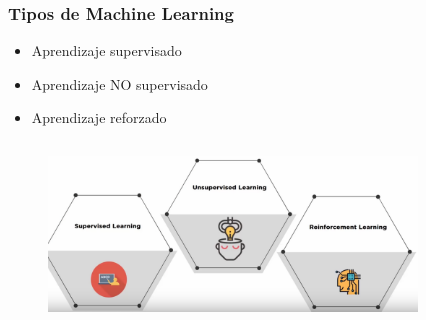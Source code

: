 \documentclass[10pt]{beamer}
\begin{document}
\begin{frame}
\frametitle{Tipos de Machine Learning}
\begin{beamerboxesrounded}[upper=uppercolor, lower=lowercolor, shadow=true]{} 

\begin{itemize}
 \item Aprendizaje supervisado
 \item Aprendizaje NO supervisado
 \item Aprendizaje reforzado
\end{itemize}
\end{beamerboxesrounded}

\begin{columns}

\hspace{5mm}
\hspace{5mm}
\begin{column}{\textwidth}
 \begin{figure}
 \includegraphics[scale=0.175]{./Figures/tipos.png} 
 \end{figure}
\end{column}%

\begin{column}{.33\textwidth}
 \begin{figure}
 \end{figure}  
\end{column}%

\end{columns}

\end{frame}
\end{document}
